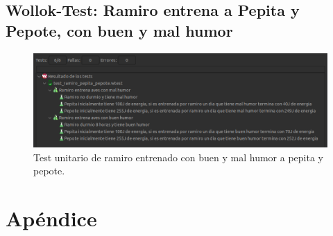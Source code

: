 \documentclass[11pt,a4paper]{article}
\begin{document}
\subsection{Wollok-Test: Ramiro entrena a Pepita y Pepote, con buen y mal humor}


\begin{figure}[H]
	\centering
	\includegraphics[scale=0.5]{figuras/test_ramiro_pepita_pepote.png}
    \caption{Test unitario de ramiro entrenado con buen y mal humor a pepita y pepote.}
    \label{fig:test ramiro entrena a pepita y pepote}
\end{figure}  

\newpage

\appendix
\section{Apéndice}
%
%
\end{document}
